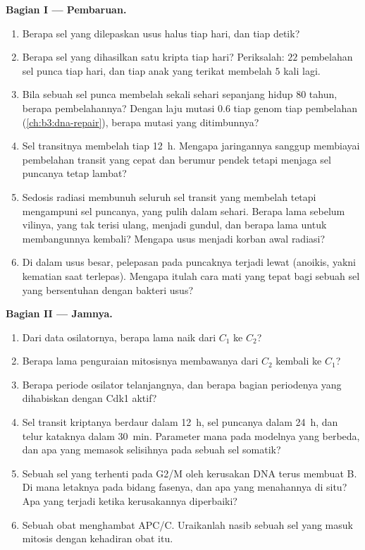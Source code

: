 \begin{problem}
\medskip
\noindent\textbf{Bagian I --- Pembaruan.}
\begin{enumerate}
  \item Berapa sel yang dilepaskan usus halus tiap hari, dan tiap
        detik?
  \item Berapa sel yang dihasilkan satu kripta tiap hari? Periksalah: $22$
        pembelahan sel punca tiap hari, dan tiap anak yang terikat membelah
        $5$ kali lagi.
  \item Bila sebuah sel punca membelah sekali sehari sepanjang hidup $80$
        tahun, berapa pembelahannya? Dengan laju mutasi $0.6$ tiap genom tiap
        pembelahan (\cref{ch:b3:dna-repair}), berapa mutasi yang
        ditimbunnya?
  \item Sel transitnya membelah tiap \qty{12}{h}. Mengapa jaringannya
        sanggup membiayai pembelahan transit yang cepat dan berumur pendek
        tetapi menjaga sel puncanya tetap lambat?
  \item Sedosis radiasi membunuh seluruh sel transit yang membelah tetapi
        mengampuni sel puncanya, yang pulih dalam sehari. Berapa lama
        sebelum vilinya, yang tak terisi ulang, menjadi gundul, dan berapa
        lama untuk membangunnya kembali? Mengapa usus menjadi korban awal
        radiasi?
  \item Di dalam usus besar, pelepasan pada puncaknya terjadi lewat 
        (anoikis, yakni kematian saat terlepas). Mengapa itulah cara mati yang
        tepat bagi sebuah sel yang bersentuhan dengan bakteri usus?
\end{enumerate}

\medskip
\noindent\textbf{Bagian II --- Jamnya.}
\begin{enumerate}[resume]
  \item Dari data osilatornya, berapa lama  naik
        dari $C_{1}$ ke $C_{2}$?
  \item Berapa lama penguraian mitosisnya membawanya dari $C_{2}$
        kembali ke $C_{1}$?
  \item Berapa periode osilator telanjangnya, dan berapa bagian periodenya
        yang dihabiskan dengan Cdk1 aktif?
  \item Sel transit kriptanya berdaur dalam \qty{12}{h}, sel puncanya
        dalam \qty{24}{h}, dan telur kataknya dalam \qty{30}{min}. Parameter
        mana pada modelnya yang berbeda, dan apa yang memasok
        selisihnya pada sebuah sel somatik?
  \item Sebuah sel yang terhenti pada  G2/M oleh kerusakan DNA
        terus membuat  B. Di mana letaknya pada bidang fasenya, dan apa
        yang menahannya di situ? Apa yang terjadi ketika kerusakannya
        diperbaiki?
  \item Sebuah obat menghambat APC/C. Uraikanlah nasib sebuah sel yang masuk
        mitosis dengan kehadiran obat itu.
\end{enumerate}


\end{problem}
